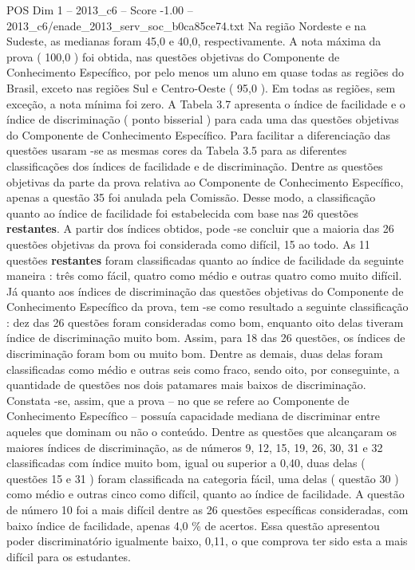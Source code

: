 \begin{textsample}{POS Dim 1 – 2013\_c6 – Score -1.00 – 2013\_c6/enade\_2013\_serv\_soc\_b0ca85ce74.txt}
Na região Nordeste e na Sudeste, as medianas foram 45,0 e 40,0, respectivamente.
A nota máxima da prova ( 100,0 ) foi obtida, nas questões objetivas do Componente de Conhecimento Específico, por pelo menos um aluno em quase todas as regiões do Brasil, exceto nas regiões Sul e Centro-Oeste ( 95,0 ).
Em todas as regiões, sem exceção, a nota mínima foi zero.
A Tabela 3.7 apresenta o índice de facilidade e o índice de discriminação ( ponto bisserial ) para cada uma das questões objetivas do Componente de Conhecimento Específico.
Para facilitar a diferenciação das questões usaram -se as mesmas cores da Tabela 3.5 para as diferentes classificações dos índices de facilidade e de discriminação.
Dentre as questões objetivas da parte da prova relativa ao Componente de Conhecimento Específico, apenas a questão 35 foi anulada pela Comissão.
Desse modo, a classificação quanto ao índice de facilidade foi estabelecida com base nas 26 questões \textbf{restantes}.
A partir dos índices obtidos, pode -se concluir que a maioria das 26 questões objetivas da prova foi considerada como difícil, 15 ao todo.
As 11 questões \textbf{restantes} foram classificadas quanto ao índice de facilidade da seguinte maneira : três como fácil, quatro como médio e outras quatro como muito difícil.
Já quanto aos índices de discriminação das questões objetivas do Componente de Conhecimento Específico da prova, tem -se como resultado a seguinte classificação : dez das 26 questões foram consideradas como bom, enquanto oito delas tiveram índice de discriminação muito bom.
Assim, para 18 das 26 questões, os índices de discriminação foram bom ou muito bom.
Dentre as demais, duas delas foram classificadas como médio e outras seis como fraco, sendo oito, por conseguinte, a quantidade de questões nos dois patamares mais baixos de discriminação.
Constata -se, assim, que a prova – no que se refere ao Componente de Conhecimento Específico – possuía capacidade mediana de discriminar entre aqueles que dominam ou não o conteúdo.
Dentre as questões que alcançaram os maiores índices de discriminação, as de números 9, 12, 15, 19, 26, 30, 31 e 32 classificadas com índice muito bom, igual ou superior a 0,40, duas delas ( questões 15 e 31 ) foram classificada na categoria fácil, uma delas ( questão 30 ) como médio e outras cinco como difícil, quanto ao índice de facilidade.
A questão de número 10 foi a mais difícil dentre as 26 questões específicas consideradas, com baixo índice de facilidade, apenas 4,0 \% de acertos.
Essa questão apresentou poder discriminatório igualmente baixo, 0,11, o que comprova ter sido esta a mais difícil para os estudantes.

\end{textsample}
